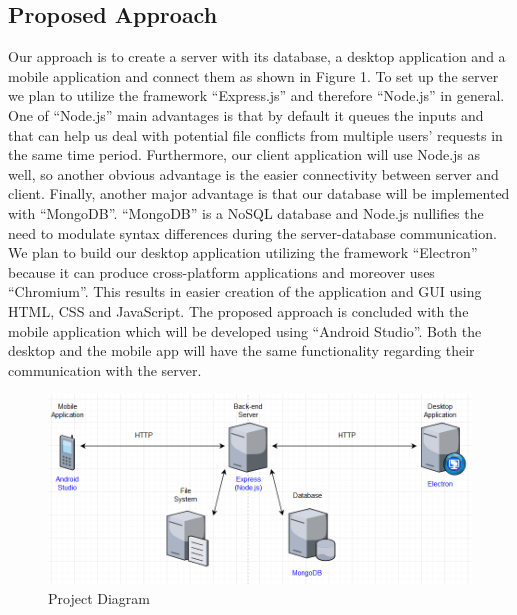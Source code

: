 \documentclass[11pt]{article}
\begin{document}
	\subsection{Proposed Approach}
	Our approach is to create a server with its database, a desktop application and a mobile application and connect them as shown in Figure 1. 
To set up the server we plan to utilize the framework “Express.js” and therefore “Node.js” in general. One of “Node.js” main advantages is that by default it queues the inputs and that can help us deal with potential file conflicts from multiple users’ requests in the same time period. Furthermore, our client application will use Node.js as well, so another obvious advantage is the easier connectivity between server and client. Finally, another major advantage is that our database will be implemented with “MongoDB”. “MongoDB” is a NoSQL database and Node.js nullifies the need to modulate syntax differences during the server-database communication. We plan to build our desktop application utilizing the framework “Electron” because it can produce cross-platform applications and moreover uses “Chromium”. This results in easier creation of the application and GUI using HTML, CSS and JavaScript. The proposed approach is concluded with the mobile application which will be developed using “Android Studio”. Both the desktop and the mobile app will have the same functionality regarding their communication with the server.
\begin{figure}[h]
\centering
\includegraphics[scale=0.7]{ProjectDiagram.png}
\caption{Project Diagram}
\end{figure}
\end{document}
